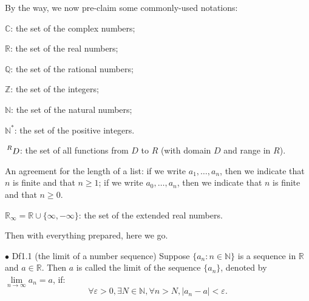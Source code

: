 \documentclass{article}
\begin{document}
By the way, we now pre-claim some commonly-used notations:
\begin{compactenum}
    \item $\mathbb{C}$: the set of the complex numbers;
    \item $\mathbb{R}$: the set of the real numbers;
    \item $\mathbb{Q}$: the set of the rational numbers;
    \item $\mathbb{Z}$: the set of the integers;
    \item $\mathbb{N}$: the set of the natural numbers;
    \item $\mathbb{N^\ast}$: the set of the positive integers.
    \item $\sideset{^R}{}{\mathop{D}}$: the set of all functions from $D$ to $R$ (with domain $D$ and range in $R$).
    \item An agreement for the length of a list: if we write $a_1, \dots, a_n$, then we indicate that $n$ is finite and that $n\geq 1$; if we write $a_0, \dots, a_n$, then we indicate that $n$ is finite and that $n\geq 0$.
    \item $\mathbb{R}_\infty = \mathbb{R}\cup\{\infty, -\infty\}$: the set of the extended real numbers.
\end{compactenum} 
Then with everything prepared, here we go.

\begin{Df}{$\bullet$ Df1.1 (the limit of a number sequence)}
    Suppose $\{a_n: n\in\mathbb{N}\}$ is a sequence in $\mathbb{R}$ and $a\in\mathbb{R}$. Then $a$ is called the limit of the sequence $\{a_n\}$, denoted by $\lim\limits_{n\to\infty}a_n=a$, if: 
    $$\forall \varepsilon>0, \exists N\in\mathbb{N}, \forall n > N, |a_n-a|<\varepsilon.$$
\end{Df}
\end{document}
